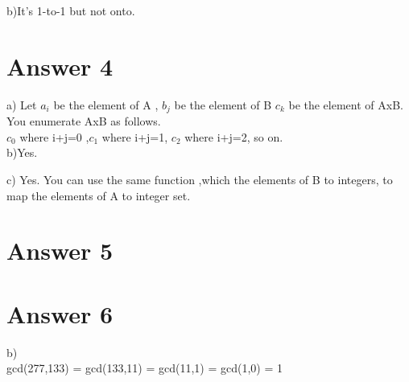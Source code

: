 \documentclass[12pt]{article}
\begin{document}
b)It's 1-to-1 but not onto. \\

\section*{Answer 4}
a) Let $a_{i}$ be the element of A , $b_{j}$ be the element of B $c_{k}$ be the element of AxB. \\
You enumerate AxB as follows. \\
$c_{0}$ where i+j=0 ,$ c_{1} $ where i+j=1, $c_{2}$ where i+j=2, so on. \\

b)Yes.

c) Yes. You can use the same function ,which the elements of B to integers, to map the elements of A to integer set. 


\section*{Answer 5}


\section*{Answer 6}
b) \\

gcd(277,133) = gcd(133,11) = gcd(11,1) = gcd(1,0) = 1
\end{document}
